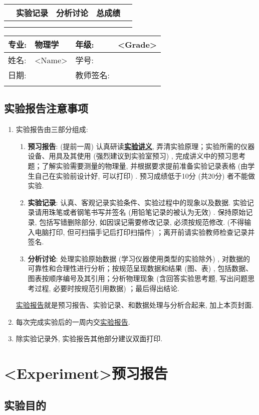 \documentclass{ctexart}
\title{\experimentname}
\author{\stuID \student}
\date{\today}
\newcommand{\experimentname}{<Experiment>}
\newcommand{\student}{<Name>}
\newcommand{\Grade}{<Grade>}
\newcommand{\stuID}{<Student ID>}
\newcommand{\previewdate}{<Preview Date>}
\newcommand{\inlinemaketitle}{{\let\newpage\relax\maketitle}}
\theoremstyle{ansstyle}
\newcommand{\infotable}{%
    \begin{center}
        \begin{tabular}{|p{1.49cm}<{\centering}|p{1.49cm}<{\centering}|p{1.49cm}<{\centering}|p{1.49cm}<{\centering}|p{1.49cm}<{\centering}|p{1.49cm}<{\centering}|p{1.49cm}<{\centering}|p{1.49cm}<{\centering}|}
            \specialrule{0em}{0.3cm}{0cm}
            \hline
            \multicolumn{2}{|c|}{\LARGE 预习实验} & \multicolumn{2}{c|}{\LARGE 实验记录}& \multicolumn{2}{c|}{\LARGE 分析讨论} & \multicolumn{2}{c|}{\LARGE 总成绩} \\
            \hline
            &&&&&&& \\
            \hline
            \specialrule{0em}{0.3cm}{0cm}
        \end{tabular}
    \end{center}%
}
\newcommand{\previewdata}{%
    \begin{center}
        \begin{tabular}{|p{1.5cm}|p{4.5cm}|p{4cm}|p{3.65cm}|}
            \hline
            {\large 专业}:  & {\large 物理学}    & {\large 年级: }    & {\large \Grade} \\
            \hline
            {\large 姓名: } & {\large \student} & {\large 学号: }    & {\large \stuID} \\
            \hline
            {\large 日期: } & {\large \previewdate} & {\large 教师签名: } & \\
            \hline
            \specialrule{0em}{0.6cm}{0cm}
        \end{tabular}
    \end{center}%
}
\begin{document}
\noindent
\renewcommand\arraystretch{1.8}
\infotable

\renewcommand\arraystretch{1.3}
\previewdata

\inlinemaketitle
\tableofcontents

\subsection{实验报告注意事项}
    
\begin{enumerate}
    \item 实验报告由三部分组成: 
    \begin{enumerate}
        \item \textbf{预习报告}: 
         (提前一周) 认真研读\underline{\textbf{实验讲义}}, 弄清实验原理；实验所需的仪器设备、用具及其使用 (强烈建议到实验室预习) , 完成讲义中的预习思考题；了解实验需要测量的物理量, 并根据要求提前准备实验记录表格 (由学生自己在实验前设计好, 可以打印) . 预习成绩低于10分 (共20分) 者不能做实验. 
        \item \textbf{实验记录}: 
        认真、客观记录实验条件、实验过程中的现象以及数据. 实验记录请用珠笔或者钢笔书写并签名 ({\color{red}用铅笔记录的被认为无效}) . {\color{red}保持原始记录, 包括写错删除部分, 如因误记需要修改记录, 必须按规范修改. } (不得输入电脑打印, 但可扫描手记后打印扫描件) ；离开前请实验教师检查记录并签名. 
        \item \textbf{分析讨论}: 
        处理实验原始数据 (学习仪器使用类型的实验除外) , 对数据的可靠性和合理性进行分析；按规范呈现数据和结果 (图、表) , 包括数据、图表按顺序编号及其引用；分析物理现象 (含回答实验思考题, 写出问题思考过程, 必要时按规范引用数据) ；最后得出结论. 
    \end{enumerate}
    \underline{实验报告}就是预习报告、实验记录、和数据处理与分析合起来, 加上本页封面. 
    \item 每次完成实验后的一周内交\underline{实验报告}. 
    \item 除实验记录外, 实验报告其他部分建议双面打印. 
\end{enumerate}


\section*{\experimentname 预习报告}

\subsection{实验目的}
\end{document}

